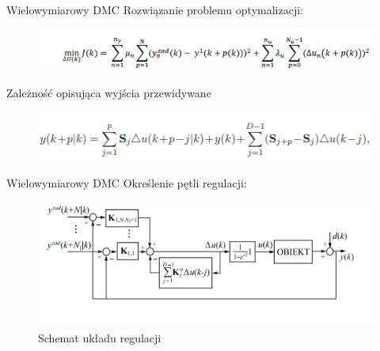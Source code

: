 \begin{frame}{Wielowymiarowy DMC}
Rozwiązanie problemu optymalizacji:
	\begin{center}
		\begin{figure}[H]
            		\includegraphics[scale=0.6]{images/cel_DMC.png}
		\end{figure}
	\end{center}
Zależność opisująca wyjścia przewidywane 
\begin{center}
		\begin{figure}[H]
            		\includegraphics[scale=0.7]{images/wyjscia_DMC.png}
		\end{figure}
	\end{center}
\end{frame}

\begin{frame}{Wielowymiarowy DMC}
Określenie pętli regulacji:
	\begin{center}
		\begin{figure}[H]
            		\includegraphics[scale=0.7]{images/SISODMC.png}
          			 \caption{Schemat układu regulacji}
		\end{figure}
	\end{center}
\end{frame}

